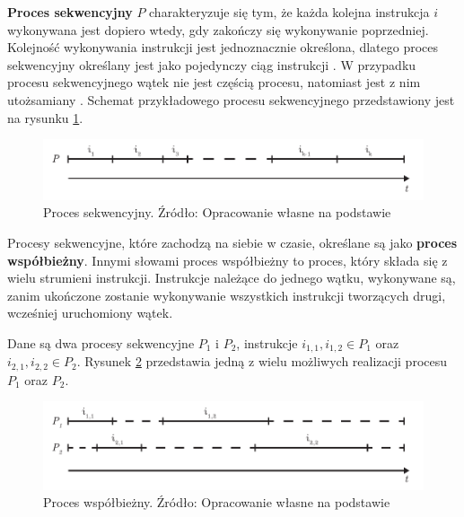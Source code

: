 \documentclass[12pt]{article}
\begin{document}
\textbf{Proces sekwencyjny} $P$ charakteryzuje się tym, że każda kolejna instrukcja $i$ wykonywana jest dopiero wtedy, gdy zakończy
się wykonywanie poprzedniej. Kolejność wykonywania instrukcji jest jednoznacznie określona, dlatego proces sekwencyjny
określany jest jako pojedynczy ciąg instrukcji \cite{wprowadzenie-do-obliczen-rownoleglych}. W przypadku procesu sekwencyjnego
wątek nie jest częścią procesu, natomiast jest z nim utożsamiany \cite{skrypt}. Schemat przykładowego procesu sekwencyjnego
przedstawiony jest na rysunku \ref{fig:sequential}.

\begin{figure}[H]
    \centering
	\includegraphics[width=\textwidth]{sequential.pdf}
    \caption{Proces sekwencyjny. Źródło: Opracowanie własne na podstawie \cite{wprowadzenie-do-obliczen-rownoleglych}}
    \label{fig:sequential}
\end{figure}

\newpage 

Procesy sekwencyjne, które zachodzą na siebie w czasie, określane są jako \textbf{proces współbieżny}. Innymi słowami
proces współbieżny to proces, który składa się z wielu strumieni instrukcji.
Instrukcje należące do jednego wątku, wykonywane są, zanim ukończone zostanie wykonywanie
wszystkich instrukcji tworzących drugi, wcześniej uruchomiony wątek.

Dane są dwa procesy sekwencyjne $P_1$ i $P_2$, instrukcje $i_{1,1}, i_{1,2} \in P_1$ oraz $i_{2,1}, i_{2,2} \in P_2$.
Rysunek \ref{fig:concurrent} przedstawia jedną z wielu możliwych realizacji procesu $P_1$ oraz $P_2$.

\begin{figure}[H]
    \centering
	\includegraphics[width=\textwidth]{concurrent.pdf}
    \caption{Proces współbieżny. Źródło: Opracowanie własne na podstawie \cite{wprowadzenie-do-obliczen-rownoleglych}}
    \label{fig:concurrent}
\end{figure}
\end{document}
